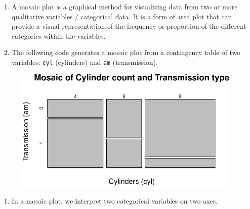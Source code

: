 \documentclass[
  letterpaper,
  DIV=11,
  numbers=noendperiod]{scrreport}
\newenvironment{Shaded}{\begin{snugshade}}{\end{snugshade}}
\newcommand{\AttributeTok}[1]{\textcolor[rgb]{0.40,0.45,0.13}{#1}}
\newcommand{\CommentTok}[1]{\textcolor[rgb]{0.37,0.37,0.37}{#1}}
\newcommand{\FunctionTok}[1]{\textcolor[rgb]{0.28,0.35,0.67}{#1}}
\newcommand{\NormalTok}[1]{\textcolor[rgb]{0.00,0.23,0.31}{#1}}
\newcommand{\SpecialCharTok}[1]{\textcolor[rgb]{0.37,0.37,0.37}{#1}}
\newcommand{\StringTok}[1]{\textcolor[rgb]{0.13,0.47,0.30}{#1}}
\providecommand{\tightlist}{%
  \setlength{\itemsep}{0pt}\setlength{\parskip}{0pt}}\usepackage{longtable,booktabs,array}
\begin{document}
\begin{enumerate}
\def\labelenumi{\arabic{enumi}.}
\item
  A mosaic plot is a graphical method for visualizing data from two or
  more qualitative variables / categorical data. It is a form of area
  plot that can provide a visual representation of the frequency or
  proportion of the different categories within the variables.
\item
  The following code generates a mosaic plot from a contingency table of
  two variables: \texttt{cyl} (cylinders) and \texttt{am}
  (transmission).
\end{enumerate}

\begin{Shaded}
\end{Shaded}

\begin{figure}[H]

{\centering \includegraphics{08CategoricalData02_files/figure-pdf/unnamed-chunk-25-1.pdf}

}

\end{figure}

\begin{enumerate}
\def\labelenumi{\arabic{enumi}.}
\setcounter{enumi}{1}
\tightlist
\item
  In a mosaic plot, we interpret two categorical variables on two axes.
\end{enumerate}
\end{document}
